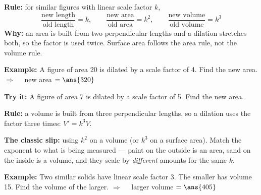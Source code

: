\documentclass[12pt]{article}
\begin{document}


\begin{formulabox}
\textbf{Rule:} for similar figures with linear scale factor $k$,
\[ \frac{\text{new length}}{\text{old length}} = k, \qquad
   \frac{\text{new area}}{\text{old area}} = k^2, \qquad
   \frac{\text{new volume}}{\text{old volume}} = k^3 \]
\textbf{Why:} an area is built from two perpendicular lengths and a dilation stretches
both, so the factor is used twice. Surface area follows the area rule, not the volume
rule.
\end{formulabox}

\begin{examplebox}
\textbf{Example:} \quad A figure of area 20 is dilated by a scale factor of 4. Find the
new area.
$\Rightarrow\quad$ new area $= \ans{320}$
\end{examplebox}

\begin{tryitbox}
\textbf{Try it:} \quad A figure of area 7 is dilated by a scale factor of 5. Find the new
area.\\[2pt]
\end{tryitbox}


\begin{formulabox}
\textbf{Rule:} a volume is built from three perpendicular lengths, so a dilation uses the
factor three times: $V' = k^3 V$.\par
\smallskip
\textbf{The classic slip:} using $k^2$ on a volume (or $k^3$ on a surface area). Match the
exponent to what is being measured --- paint on the outside is an area, sand on the inside
is a volume, and they scale by \emph{different} amounts for the same $k$.
\end{formulabox}

\begin{examplebox}
\textbf{Example:} \quad Two similar solids have linear scale factor 3. The smaller has
volume 15. Find the volume of the larger.
$\Rightarrow\quad$ larger volume $= \ans{405}$
\end{examplebox}
\end{document}
